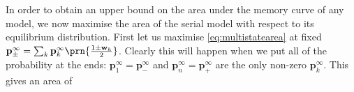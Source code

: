 \documentclass[9pt,twocolumn,twoside,lineno]{pnas-new}
\newcommand{\wrt}{wrt.\ }
\newcommand{\pdiff}[3][]{\frac{\partial^{#1} #2}{\partial {#3}^{#1}}}
\newcommand{\CL}{\mathcal{L}}
\newcommand{\prob}{\mathbf{p}}
\newcommand{\eq}{\prob^\infty}
\newcommand{\w}{\mathbf{w}}
\begin{document}
\begin{strip}
%

In order to obtain an upper bound on the area under the memory curve of any model, we now maximise the area of the serial model with respect to its equilibrium distribution.
First let us maximise \cref{eq:multistatearea} at fixed $\eq_\pm = \sum_k \eq_k \prn{\frac{1\pm\w_k}{2}}$.
Clearly this will happen when we put all of the probability at the ends: $\eq_1=\eq_-$ and $\eq_n=\eq_+$ are the only non-zero $\eq_k$.
This gives an area of


\end{strip}
\end{document}
